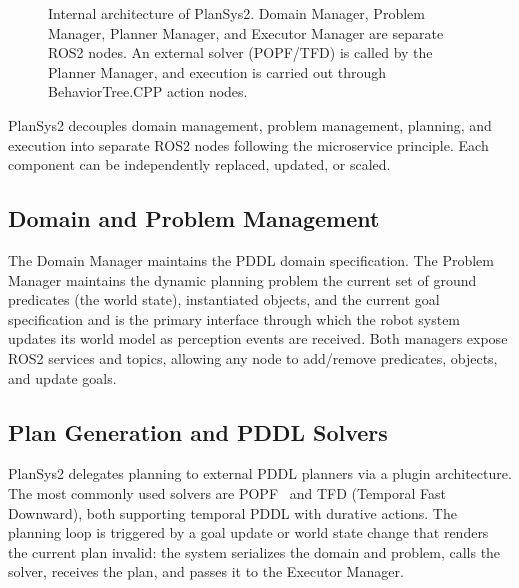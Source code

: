 \documentclass[12pt,a4paper]{article}
\theoremstyle{definition}
\theoremstyle{plain}
\begin{document}
\begin{figure}[H]
\caption{Internal architecture of PlanSys2. Domain Manager, Problem Manager, Planner Manager,
and Executor Manager are separate ROS2 nodes. An external solver (POPF/TFD) is called by the
Planner Manager, and execution is carried out through BehaviorTree.CPP action nodes.}
\label{fig:plansys2arch}
\end{figure}

PlanSys2 decouples domain management, problem management, planning, and execution into separate
ROS2 nodes following the microservice principle. Each component can be independently replaced,
updated, or scaled.

\subsection{Domain and Problem Management}

The Domain Manager maintains the PDDL domain specification. The Problem Manager maintains the
dynamic planning problem the current set of ground predicates (the world state), instantiated
objects, and the current goal specification and is the primary interface through which the robot
system updates its world model as perception events are received. Both managers expose ROS2
services and topics, allowing any node to add/remove predicates, objects, and update goals.

\subsection{Plan Generation and PDDL Solvers}

PlanSys2 delegates planning to external PDDL planners via a plugin architecture. The most
commonly used solvers are POPF~\cite{coles2010forward} and TFD (Temporal Fast Downward), both
supporting temporal PDDL with durative actions. The planning loop is triggered by a goal update
or world state change that renders the current plan invalid: the system serializes the domain and
problem, calls the solver, receives the plan, and passes it to the Executor Manager.
\end{document}
